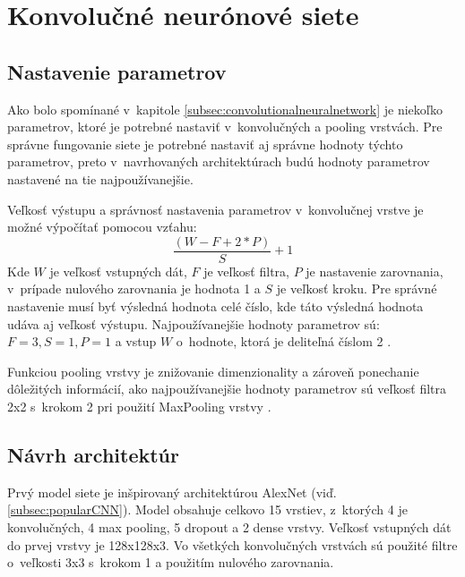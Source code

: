 
\section{Konvolučné neurónové siete}
\label{sec:architekuraCNN}

\subsection{Nastavenie parametrov}
\label{subsec:nastavenieparametrov}
Ako bolo spomínané v~kapitole \ref{subsec:convolutionalneuralnetwork} je niekoľko parametrov, ktoré je potrebné
    nastaviť v~konvolučných a pooling vrstvách.
Pre správne fungovanie siete je potrebné nastaviť aj správne hodnoty týchto parametrov, preto v~navrhovaných architektúrach budú
    hodnoty parametrov nastavené na tie najpoužívanejšie.

Veľkosť výstupu a správnosť nastavenia parametrov v~konvolučnej vrstve je možné výpočítať pomocou vzťahu:
\begin{equation}
    \frac{(W - F + 2*P)}{S} + 1
\end{equation}
Kde $W$ je veľkosť vstupných dát, $F$ je veľkosť filtra, $P$ je nastavenie zarovnania, v~prípade nulového zarovnania je hodnota 1 a $S$ je veľkosť kroku.
Pre správné nastavenie musí byť výsledná hodnota celé číslo, kde táto výsledná hodnota udáva aj veľkosť výstupu.
Najpoužívanejšie hodnoty parametrov sú: $F = 3, S = 1, P = 1$ a vstup $W$ o~hodnote, ktorá je deliteľná číslom 2 \cite{odkaz:CNNArchitecture}.

Funkciou pooling vrstvy je znižovanie dimenzionality a zároveň ponechanie dôležitých informácií, ako najpoužívanejšie hodnoty parametrov sú
    veľkosť filtra 2x2 s~krokom 2 pri použití MaxPooling vrstvy \cite{odkaz:CNNArchitecture}.


\subsection{Návrh architektúr}
\label{subsec:navrharchitektur}
Prvý model siete je inšpirovaný architektúrou AlexNet (viď. \ref{subsec:popularCNN}).
Model obsahuje celkovo 15 vrstiev, z~ktorých 4 je konvolučných, 4 max pooling, 5 dropout a 2 dense vrstvy.
Veľkosť vstupných dát do prvej vrstvy je 128x128x3.
Vo všetkých konvolučných vrstvách sú použité filtre o~veľkosti 3x3 s~krokom 1 a použitím nulového zarovnania.

